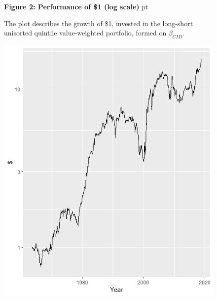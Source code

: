 \documentclass[12pt]{article}
\begin{document}
\begin{figure}
\textbf{Figure 2: Performance of \$1 (log scale)}
 pt
\begin{flushleft}
{The plot describes the growth of \$1, invested in the long-short unisorted quintile value-weighted portfolio, formed on $\beta_{CID}$.}
\end{flushleft}
\centering
\includegraphics[width=1\textwidth]{Figure2.png}
\end{figure}
\end{document}
